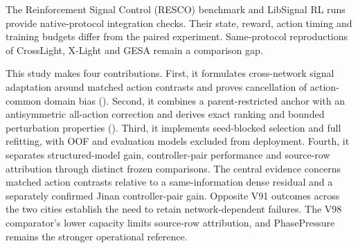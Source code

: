The Reinforcement Signal Control (RESCO) benchmark
\citep{ault2021reinforcement} and LibSignal \citep{mei2022libsignal} RL runs
provide native-protocol integration checks.  Their state, reward, action
timing and training budgets differ from the paired experiment.
Same-protocol reproductions of CrossLight, X-Light and GESA remain a
comparison gap.

This study makes four contributions.  First, it formulates cross-network
signal adaptation around matched action contrasts and proves cancellation of
action-common domain bias ().  Second, it combines
a parent-restricted anchor with an antisymmetric all-action correction and
derives exact ranking and bounded perturbation properties
().
Third, it implements seed-blocked selection and full refitting, with OOF and
evaluation models excluded from deployment.  Fourth, it separates
structured-model gain, controller-pair performance and source-row attribution
through distinct frozen comparisons.  The central evidence concerns matched
action contrasts relative to a same-information dense residual and a
separately confirmed Jinan controller-pair gain.  Opposite V91 outcomes across
the two cities establish the need to retain network-dependent failures.
The V98 comparator's lower capacity limits source-row attribution, and
PhasePressure remains the stronger operational reference.
